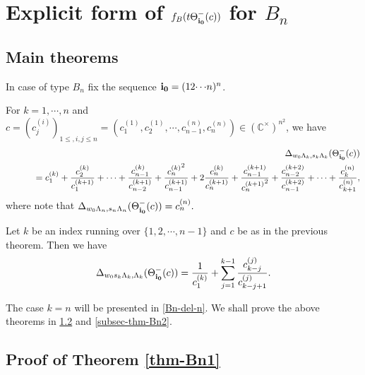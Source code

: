 \section{Explicit form of 
$f_B(t\Theta_{\bfii0}^-(c))$ for $B_n$}
\setcounter{equation}{0}

\subsection{Main theorems}
In case of type $B_n$ fix the sequence 
$\bfii0=(12{\cdots} n)^n$. 
\begin{thm}\label{thm-Bn1}
For $k=1,{\cdots},n$ and 
$c=({c_{j}^{(i)}})_{1\leq,i,j\leq n}=
({c_{1}^{(1)}},{c_{2}^{(1)}},{\cdots},{c_{n-1}^{(n)}},{c_{n}^{(n)}})\in({\mathbb C}^\times)^{n^2}$, we have
\begin{eqnarray*}
&&{\Delta}_{w_0{\Lambda}_k,s_k{\Lambda}_k}(\Theta^-_\bfii0(c))\\
&&{\qquad}=
{c_{1}^{(k)}}+\frac{{c_{2}^{(k)}}}{{c_{1}^{(k+1)}}}+{\cdots}+
\frac{{c_{n-1}^{(k)}}}{{c_{n-2}^{(k+1)}}}+\frac{{{c_{n}^{(k)}}}^2}{{c_{n-1}^{(k+1)}}}
+2\frac{{c_{n}^{(k)}}}{{c_{n}^{(k+1)}}}+\frac{{c_{n-1}^{(k+1)}}}{{{c_{n}^{(k+1)}}}^2}
+\frac{{c_{n-2}^{(k+2)}}}{{c_{n-1}^{(k+2)}}}+{\cdots}+
\frac{{c_{k}^{(n)}}}{{c_{k+1}^{(n)}}},
\end{eqnarray*}
where note that 
${\Delta}_{w_0{\Lambda}_n,s_n{\Lambda}_n}(\Theta^-_\bfii0(c))={c_{n}^{(n)}}.$
\end{thm}
\begin{thm}\label{thm-Bn2}
Let $k$ be an index running over $\{1,2,{\cdots},n-1\}$ and $c$ be as in the
previous theorem.
Then we have
\begin{eqnarray}
{\Delta}_{w_0s_k{\Lambda}_k,{\Lambda}_k}(\Theta^-_\bfii0(c))
=\frac{1}{{c_{1}^{(k)}}}+\sum_{j=1}^{k-1}\frac{{c_{k-j}^{(j)}}}{{c_{k-j+1}^{(j)}}}.
\end{eqnarray}
\end{thm}
The case $k=n$ will be presented in \ref{Bn-del-n}.
We shall prove the above theorems in \ref{proof-b-1} and 
\ref{subsec-thm-Bn2}.
\subsection{Proof of Theorem \ref{thm-Bn1}}\label{proof-b-1}

